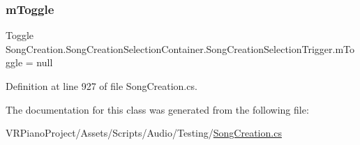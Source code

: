 \subsubsection{\texorpdfstring{m\+Toggle}{mToggle}}
{\footnotesize\ttfamily Toggle Song\+Creation.\+Song\+Creation\+Selection\+Container.\+Song\+Creation\+Selection\+Trigger.\+m\+Toggle = null\hspace{0.3cm}{\ttfamily [private]}}



Definition at line 927 of file Song\+Creation.\+cs.



The documentation for this class was generated from the following file\+:\begin{DoxyCompactItemize}
\item 
V\+R\+Piano\+Project/\+Assets/\+Scripts/\+Audio/\+Testing/\hyperlink{_song_creation_8cs}{Song\+Creation.\+cs}\end{DoxyCompactItemize}
